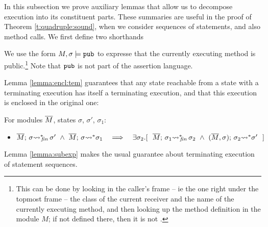In this subsection we prove auxiliary lemmas that allow us to decompose execution into its constituent parts. 
These summaries are useful in the proof of Theorem \ref{t:quadruple:sound}, when we consider sequences of statements, and also method calls.
We first define two shorthands
 
\begin{definition}
We use the form
$M, \sigma \models \mbox{\normalfont{\texttt{pub}}}$ to expresse that the currently executing method is public.\footnote{This can be done by looking in the caller's frame -- ie the one right under the topmost frame -- the class of the current receiver and the name of the currently executing method, and then looking up the method definition in the module $M$; if not defined there, then it is not . }
Note that $\mbox{\normalfont{\texttt{pub}}}$ is not part of the assertion language.
\end{definition}
 


\label{sect:termExecs}

 
Lemma \ref{lemma:encl:tem} guarantees that any state reachable from a state with a terminating execution has itself a terminating execution, and that this execution is enclosed in the original one:
 
 \begin{auxLemma}
 \label{lemma:encl:tem}
 For   modules $\overline{M}$,   states $\sigma$, $\sigma'$, $\sigma_1$:
\begin{itemize}
\item
$  \leadstoBoundedStarFin {\Mtwo}  {\sigma}  {\sigma'} \  \wedge \  \leadstoBoundedStar  {\Mtwo}  {\sigma}  {\sigma_1} 
\ \ \  \Longrightarrow\ \ \  %
 \exists \sigma_2.[\ \ \leadstoBoundedStarFin {\Mtwo} {\sigma_1}  {\sigma_2}  
\ \wedge\ 
\leadstoBoundedStarThree  {\Mtwo}  {\sigma_2}  {\sigma}   {\sigma'} \ \ ]$
\end{itemize}

\end{auxLemma} 
 
Lemma \ref{lemma:subexp} makes the usual guarantee about terminating execution of statement sequences.
  

